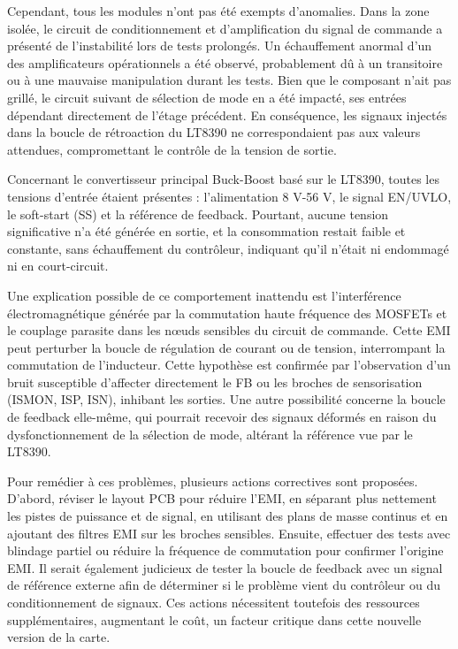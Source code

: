 Cependant, tous les modules n'ont pas été exempts d'anomalies. Dans la zone isolée, le circuit de conditionnement et d'amplification du signal de commande a présenté de l'instabilité lors de tests prolongés. Un échauffement anormal d'un des amplificateurs opérationnels a été observé, probablement dû à un transitoire ou à une mauvaise manipulation durant les tests. Bien que le composant n'ait pas grillé, le circuit suivant de sélection de mode en a été impacté, ses entrées dépendant directement de l'étage précédent. En conséquence, les signaux injectés dans la boucle de rétroaction du LT8390 ne correspondaient pas aux valeurs attendues, compromettant le contrôle de la tension de sortie.

Concernant le convertisseur principal Buck-Boost basé sur le LT8390, toutes les tensions d'entrée étaient présentes : l'alimentation 8 V-56 V, le signal EN/UVLO, le soft-start (SS) et la référence de feedback. Pourtant, aucune tension significative n'a été générée en sortie, et la consommation restait faible et constante, sans échauffement du contrôleur, indiquant qu'il n'était ni endommagé ni en court-circuit.

Une explication possible de ce comportement inattendu est l'interférence électromagnétique générée par la commutation haute fréquence des MOSFETs et le couplage parasite dans les nœuds sensibles du circuit de commande. Cette EMI peut perturber la boucle de régulation de courant ou de tension, interrompant la commutation de l'inducteur. Cette hypothèse est confirmée par l'observation d'un bruit susceptible d'affecter directement le FB ou les broches de sensorisation (ISMON, ISP, ISN), inhibant les sorties. Une autre possibilité concerne la boucle de feedback elle-même, qui pourrait recevoir des signaux déformés en raison du dysfonctionnement de la sélection de mode, altérant la référence vue par le LT8390.

Pour remédier à ces problèmes, plusieurs actions correctives sont proposées. D'abord, réviser le layout PCB pour réduire l'EMI, en séparant plus nettement les pistes de puissance et de signal, en utilisant des plans de masse continus et en ajoutant des filtres EMI sur les broches sensibles. Ensuite, effectuer des tests avec blindage partiel ou réduire la fréquence de commutation pour confirmer l'origine EMI. Il serait également judicieux de tester la boucle de feedback avec un signal de référence externe afin de déterminer si le problème vient du contrôleur ou du conditionnement de signaux. Ces actions nécessitent toutefois des ressources supplémentaires, augmentant le coût, un facteur critique dans cette nouvelle version de la carte.


